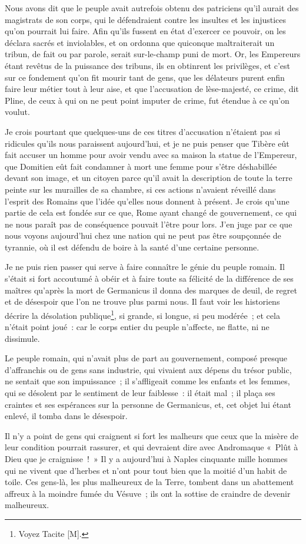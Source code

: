 \documentclass[french,twoside]{book} %
\newcommand\chapterclose{} %
\begin{document}
Nous avons dit que le peuple avait autrefois obtenu des patriciens qu’il aurait des magistrats de son corps, qui le défendraient contre les insultes et les injustices qu’on pourrait lui faire. Afin qu’ils fussent en état d’exercer ce pouvoir, on les déclara sacrés et inviolables, et on ordonna que quiconque maltraiterait un tribun, de fait ou par parole, serait sur-le-champ puni de mort. Or, les Empereurs étant revêtus de la puissance des tribuns, ils en obtinrent les privilèges, et c’est sur ce fondement qu’on fit mourir tant de gens, que les délateurs purent enfin faire leur métier tout à leur aise, et que l’accusation de lèse-majesté, ce crime, dit Pline, de ceux à qui on ne peut point imputer de crime, fut étendue à ce qu’on voulut.\par
Je crois pourtant que quelques-uns de ces titres d’accusation n’étaient pas si ridicules qu’ils nous paraissent aujourd’hui, et je ne puis penser que Tibère eût fait accuser un homme pour avoir vendu avec sa maison la statue de l’Empereur, que Domitien eût fait condamner à mort une femme pour s’être déshabillée devant son image, et un citoyen parce qu’il avait la description de toute la terre peinte sur les murailles de sa chambre, si ces actions n’avaient réveillé dans l’esprit des Romains que l’idée qu’elles nous donnent à présent. Je crois qu’une partie de cela est fondée sur ce que, Rome ayant changé de gouvernement, ce qui ne nous paraît pas de conséquence pouvait l’être pour lors. J’en juge par ce que nous voyons aujourd’hui chez une nation qui ne peut pas être soupçonnée de tyrannie, où il est défendu de boire à la santé d’une certaine personne.\par
Je ne puis rien passer qui serve à faire connaître le génie du peuple romain. Il s’était si fort accoutumé à obéir et à faire toute sa félicité de la différence de ses maîtres qu’après la mort de Germanicus il donna des marques de deuil, de regret et de désespoir que l’on ne trouve plus parmi nous. Il faut voir les historiens décrire la désolation publique\footnote{Voyez Tacite [M].}, si grande, si longue, si peu modérée ; et cela n’était point joué : car le corps entier du peuple n’affecte, ne flatte, ni ne dissimule.\par
Le peuple romain, qui n’avait plus de part au gouvernement, composé presque d’affranchis ou de gens sans industrie, qui vivaient aux dépens du trésor public, ne sentait que son impuissance ; il s’affligeait comme les enfants et les femmes, qui se désolent par le sentiment de leur faiblesse : il était mal ; il plaça ses craintes et ses espérances sur la personne de Germanicus, et, cet objet lui étant enlevé, il tomba dans le désespoir.\par
Il n’y a point de gens qui craignent si fort les malheurs que ceux que la misère de leur condition pourrait rassurer, et qui devraient dire avec Andromaque « Plût à Dieu que je craignisse ! » Il y a aujourd’hui à Naples cinquante mille hommes qui ne vivent que d’herbes et n’ont pour tout bien que la moitié d’un habit de toile. Ces gens-là, les plus malheureux de la Terre, tombent dans un abattement affreux à la moindre fumée du Vésuve ; ils ont la sottise de craindre de devenir malheureux.
\chapterclose
\end{document}
